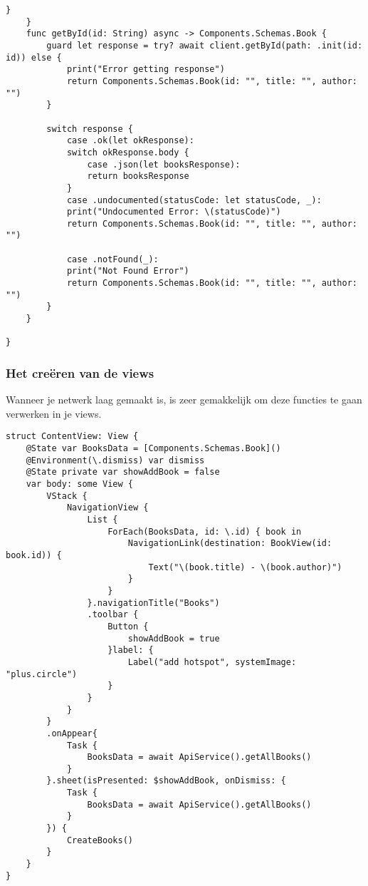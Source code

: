 \begin{lstlisting}[caption=ApiService file]
        }
    }
    func getById(id: String) async -> Components.Schemas.Book {
        guard let response = try? await client.getById(path: .init(id: id)) else {
            print("Error getting response")
            return Components.Schemas.Book(id: "", title: "", author: "")
        }
        
        switch response {
            case .ok(let okResponse):
            switch okResponse.body {
                case .json(let booksResponse):
                return booksResponse
            }
            case .undocumented(statusCode: let statusCode, _):
            print("Undocumented Error: \(statusCode)")
            return Components.Schemas.Book(id: "", title: "", author: "")
            
            case .notFound(_):
            print("Not Found Error")
            return Components.Schemas.Book(id: "", title: "", author: "")
        }
    }
    
}

\end{lstlisting}

\subsubsection{Het creëren van de views}
Wanneer je netwerk laag gemaakt is, is zeer gemakkelijk om deze functies te gaan verwerken in je views. 

\begin{lstlisting}[caption=ApiService file]
struct ContentView: View {
    @State var BooksData = [Components.Schemas.Book]()
    @Environment(\.dismiss) var dismiss
    @State private var showAddBook = false
    var body: some View {
        VStack {
            NavigationView {
                List {
                    ForEach(BooksData, id: \.id) { book in
                        NavigationLink(destination: BookView(id: book.id)) {
                            Text("\(book.title) - \(book.author)")
                        }
                    }
                }.navigationTitle("Books")
                .toolbar {
                    Button {
                        showAddBook = true
                    }label: {
                        Label("add hotspot", systemImage: "plus.circle")
                    }
                }
            }
        }
        .onAppear{
            Task {
                BooksData = await ApiService().getAllBooks()
            }
        }.sheet(isPresented: $showAddBook, onDismiss: {
            Task {
                BooksData = await ApiService().getAllBooks()
            }
        }) {
            CreateBooks()
        }
    }
}

    
\end{lstlisting}
 \newpage
